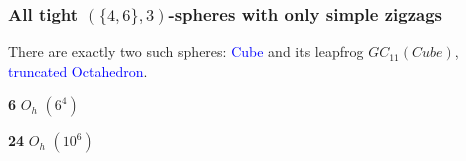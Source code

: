 \documentclass{beamer}
\begin{document}
\begin{frame}\frametitle{All tight $(\{4,6\},3)$-spheres with only simple
zigzags}

There are exactly two such spheres:
\textcolor{blue}{Cube} and its leapfrog  $GC_{11}(Cube)$, \textcolor{blue}{truncated 
Octahedron}. 



\begin{center}
\begin{minipage}{2.6cm}
\centering
{}\par
{\bf 6} $O_h$ $(6^4)$
\end{minipage}
\begin{minipage}{2.8cm}
\centering
{}\par
{\bf 24}  $O_{h}$ $(10^6)$
\end{minipage}
\end{center}\pause


\end{frame}
\end{document}
